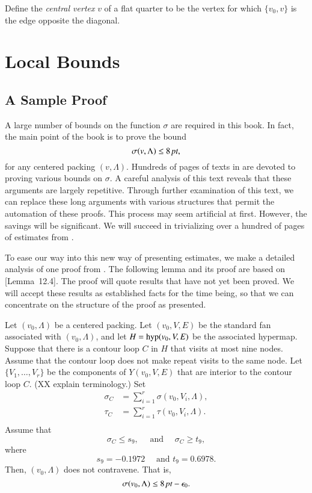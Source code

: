 \begin{definition}
Define the {\it central vertex\/} $v$ of a flat quarter to be the
vertex for which $\{v_0,v\}$ is the edge opposite the diagonal.
\end{definition}








\chapter{Local Bounds}



\section{A Sample Proof}

A large number of bounds on the function
$\sigma$ are required in this book.  In fact, the main
point of the book is to prove the bound
  $$
  \sigma(v,\Lambda)\le 8\,\hbox{\it pt},
  $$
for any centered packing $(v,\Lambda)$.
Hundreds of pages of texts in \cite{DCG} are devoted to
proving various bounds on $\sigma$.  A careful analysis of
this text reveals that these arguments are largely repetitive.
Through further examination of this text, we can replace these
long arguments with various structures that permit the automation
of these proofs.  This process may seem artificial at first.
However, the savings will be significant.  We will succeed in
trivializing over a hundred of pages of estimates from \cite{DCG}.

To ease our way into this new way of presenting estimates, 
we make a detailed analysis of
one proof from \cite{DCG}.  The following lemma and its proof are
based on \cite{DCG}[Lemma~12.4].  The proof will quote results that
have not yet been proved.  We will accept these results 
as established facts for the time being, 
so that we can concentrate on the structure
of the proof as presented.


\begin{lemma}\label{lemma:nonagon}  
Let $(v_0,\Lambda)$ be a centered packing.
Let $(v_0,V,E)$ be the standard fan associated with $(v_0,\Lambda)$,
and let $H={\operatorname{hyp}}(v_0,V,E)$ be the associated hypermap.  
Suppose that there is a contour loop $C$ in $H$ that visits
at most nine nodes.  Assume that the contour loop does not make
repeat visits to the same node.
Let $\{V_1,\ldots,V_r\}$ be the components of $Y(v_0,V,E)$ that
are interior to the contour loop $C$.  (XX explain terminology.)
Set 
   $$
   \begin{array}{lll}
   \sigma_C &= \sum_{i=1}^r \sigma(v_0,V_i,\Lambda),\\
   \tau_C &= \sum_{i=1}^r \tau(v_0,V_i,\Lambda).\\
   \end{array}
   $$
Assume that
    $$
    \sigma_C \le s_9,\quad \text{ and } \quad \sigma_C \ge t_9,
    $$
where 
    $$
    s_9 = -0.1972 \quad \text{ and } t_9 = 0.6978.
    $$
Then, $(v_0,\Lambda)$ does not contravene.  That is,
$$
\sigma(v_0,\Lambda) \le 8\,\hbox{\it pt} - \epsilon_0.
$$
\end{lemma}

